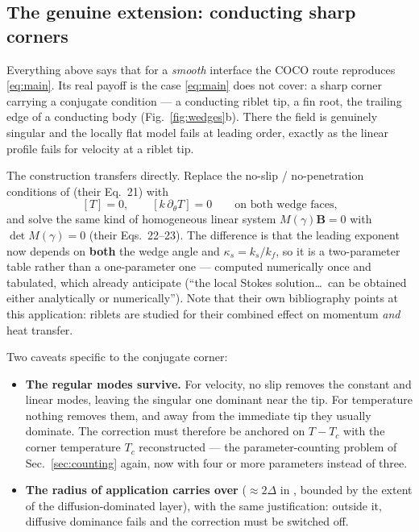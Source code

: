 \documentclass[11pt,a4paper]{article}
\newcommand{\jump}[1]{\left[#1\right]}
\begin{document}
\subsection{The genuine extension: conducting sharp corners}
\label{sec:corners}

Everything above says that for a \emph{smooth} interface the COCO route
reproduces \eqref{eq:main}. Its real payoff is the case \eqref{eq:main} does not
cover: a sharp corner carrying a conjugate condition --- a conducting riblet
tip, a fin root, the trailing edge of a conducting body
(Fig.~\ref{fig:wedges}b). There the field is genuinely singular and the locally
flat model fails at leading order, exactly as the linear profile fails for
velocity at a riblet tip.

The construction transfers directly. Replace the no-slip / no-penetration
conditions of \cite{cipelli2025} (their Eq.~21) with
\begin{equation}
  \jump{T}=0,\qquad \jump{k\,\partial_\theta T}=0
  \qquad\text{on both wedge faces,}
\end{equation}
and solve the same kind of homogeneous linear system $M(\gamma)\boldsymbol{B}=0$
with $\det M(\gamma)=0$ (their Eqs.~22--23). The difference is that the leading
exponent now depends on \textbf{both} the wedge angle and $\kappa_s=k_s/k_f$, so
it is a two-parameter table rather than a one-parameter one --- computed
numerically once and tabulated, which \cite{cipelli2025} already anticipate
(``the local Stokes solution\ldots\ can be obtained either analytically or
numerically''). Note that their own bibliography points at this application:
riblets are studied for their combined effect on momentum \emph{and} heat
transfer.

Two caveats specific to the conjugate corner:
\begin{itemize}
\item \textbf{The regular modes survive.} For velocity, no slip removes the
      constant and linear modes, leaving the singular one dominant near the
      tip. For temperature nothing removes them, and away from the immediate
      tip they usually dominate. The correction must therefore be anchored on
      $T-T_c$ with the corner temperature $T_c$ reconstructed --- the
      parameter-counting problem of Sec.~\ref{sec:counting} again, now with
      four or more parameters instead of three.
\item \textbf{The radius of application carries over}
      ($\approx2\Delta$ in \cite{cipelli2025}, bounded by the extent of the
      diffusion-dominated layer), with the same justification: outside it,
      diffusive dominance fails and the correction must be switched off.
\end{itemize}
\end{document}
